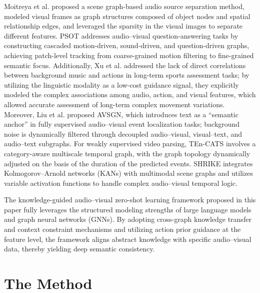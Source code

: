 \documentclass[lettersize,journal]{IEEEtran}
\begin{document}
Moitreya et al.\cite{24} proposed a scene graph-based audio source separation method, modeled visual frames as graph structures composed of object nodes and spatial relationship edges, and leveraged the sparsity in the visual images to separate different features\cite{25}. PSOT\cite{26} addresses audio–visual question-answering tasks by constructing cascaded motion-driven, sound-driven, and question-driven graphs, achieving patch-level tracking from coarse-grained motion filtering to fine-grained semantic focus. Additionally, Xu et al.\cite{27} addressed the lack of direct correlations between background music and actions in long-term sports assessment tasks; by utilizing the linguistic modality as a low-cost guidance signal, they explicitly modeled the complex associations among audio, action, and visual features, which allowed accurate assessment of long-term complex movement variations. Moreover, Liu et al.\cite{28} proposed AVSGN, which introduces text as a “semantic anchor” in fully supervised audio–visual event localization tasks; background noise is dynamically filtered through decoupled audio–visual, visual–text, and audio–text subgraphs\cite{29}. For weakly supervised video parsing, TEn-CATS\cite{30} involves a category-aware multiscale temporal graph, with the graph topology dynamically adjusted on the basis of the duration of the predicted events. SHRIKE\cite{31} integrates Kolmogorov–Arnold networks (KANs) with multimodal scene graphs and utilizes variable activation functions to handle complex audio–visual temporal logic.


The knowledge-guided audio–visual zero-shot learning framework proposed in this paper fully leverages the structured modeling strengths of large language models and graph neural networks (GNNs). By adopting cross-graph knowledge transfer and context constraint mechanisms and utilizing action prior guidance at the feature level, the framework aligns abstract knowledge with specific audio–visual data, thereby yielding deep semantic consistency.


\section{The Method}
\end{document}
